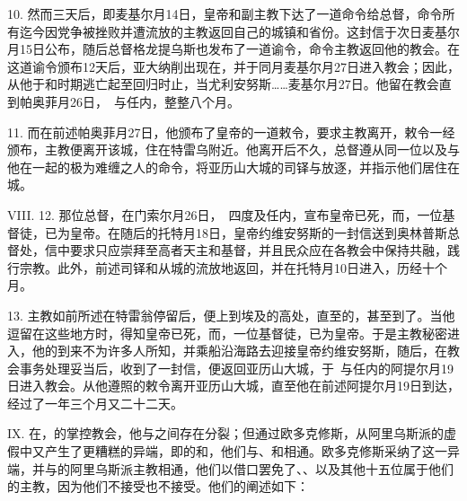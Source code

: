 10. 然而三天后，即麦基尔月14日，皇帝和副主教下达了一道命令给总督，命令所有迄今因党争被挫败并遭流放的主教返回自己的城镇和省份。这封信于次日麦基尔月15日公布，随后总督格龙提乌斯也发布了一道谕令，命令主教返回他的教会。在这道谕令颁布12天后，亚大纳削出现在，并于同月麦基尔月27日进入教会；因此，从他于和时期逃亡起至回归时止，当尤利安努斯……麦基尔月27日。他留在教会直到帕奥菲月26日，\ 与任内，整整八个月。\par

11. 而在前述帕奥菲月27日，他颁布了皇帝的一道敕令，要求主教离开，敕令一经颁布，主教便离开该城，住在特雷乌附近。他离开后不久，总督遵从同一位以及与他在一起的极为难缠之人的命令，将亚历山大城的司铎与放逐，并指示他们居住在城。\par

VIII. 12. 那位总督，在门索尔月26日，\ 四度及任内，宣布皇帝已死，而，一位基督徒，已为皇帝。在随后的托特月18日，皇帝约维安努斯的一封信送到奥林普斯总督处，信中要求只应崇拜至高者天主和基督，并且民众应在各教会中保持共融，践行宗教。此外，前述司铎和从城的流放地返回，并在托特月10日进入，历经十个月。\par

13. 主教如前所述在特雷翁停留后，便上到埃及的高处，直至的，甚至到了。当他逗留在这些地方时，得知皇帝已死，而，一位基督徒，已为皇帝。于是主教秘密进入，他的到来不为许多人所知，并乘船沿海路去迎接皇帝约维安努斯，随后，在教会事务处理妥当后，收到了一封信，便返回亚历山大城，于\ 与任内的阿提尔月19日进入教会。从他遵照的敕令离开亚历山大城，直至他在前述阿提尔月19日到达，经过了一年三个月又二十二天。\par

IX. 在，的掌控教会，他与之间存在分裂；但通过欧多克修斯，从阿里乌斯派的虚假中又产生了更糟糕的异端，即的和，他们与、和相通。欧多克修斯采纳了这一异端，并与的阿里乌斯派主教相通，他们以借口罢免了、、以及其他十五位属于他们的主教，因为他们不接受也不接受。他们的阐述如下：\par

